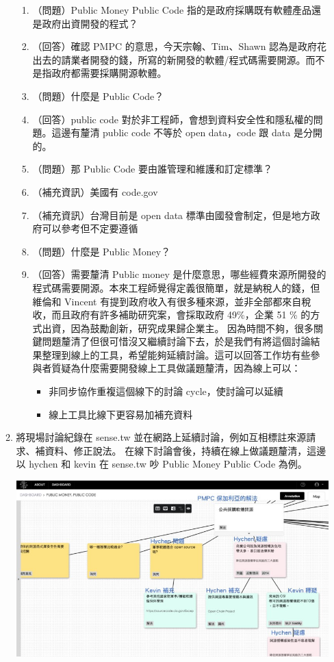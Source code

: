 \documentclass[12pt,a4paper]{article}
\begin{document}
\begin{enumerate}
\begin{enumerate}
\begin{enumerate}
\item （問題）Public Money Public Code 指的是政府採購既有軟體產品還是政府出資開發的程式？
\item （回答）確認 PMPC 的意思，今天宗翰、Tim、Shawn 認為是政府花出去的請業者開發的錢，所寫的新開發的軟體/程式碼需要開源。而不是指政府都需要採購開源軟體。
\item （問題）什麼是 Public Code？
\item （回答）public code 對於非工程師，會想到資料安全性和隱私權的問題。這邊有釐清 public code 不等於 open data，code 跟 data 是分開的。
\item （問題）那 Public Code 要由誰管理和維護和訂定標準？
\item （補充資訊）美國有 code.gov
\item （補充資訊）台灣目前是 open data 標準由國發會制定，但是地方政府可以參考但不定要遵循
\item （問題）什麼是 Public Money？
\item （回答）需要釐清 Public money 是什麼意思，哪些經費來源所開發的程式碼需要開源。本來工程師覺得定義很簡單，就是納稅人的錢，但維倫和 Vincent 有提到政府收入有很多種來源，並非全部都來自稅收，而且政府有許多補助研究案，會採取政府 49\%，企業 51 \% 的方式出資，因為鼓勵創新，研究成果歸企業主。
因為時間不夠，很多關鍵問題釐清了但很可惜沒又繼續討論下去，於是我們有將這個討論結果整理到線上的工具，希望能夠延續討論。這可以回答工作坊有些參與者質疑為什麼需要開發線上工具做議題釐清，因為線上可以：
\begin{itemize}
\item 非同步協作重複這個線下的討論 cycle，使討論可以延續
\item 線上工具比線下更容易加補充資料
\end{itemize}
\end{enumerate}
\item 將現場討論紀錄在 sense.tw 並在網路上延續討論，例如互相標註來源請求、補資料、修正說法。
在線下討論會後，持續在線上做議題釐清，這邊以 hychen 和 kevin 在 sense.tw 吵 Public Money Public Code 為例。
\begin{center}
\includegraphics[width=.9\linewidth]{./images/pmpc-hychen-kevin1.jpg}

\end{center}
\end{enumerate}
\end{enumerate}
\end{document}
